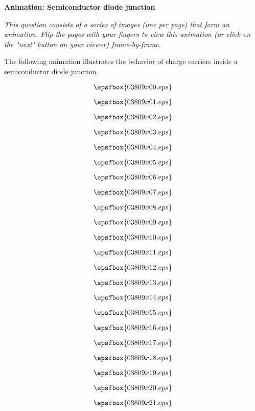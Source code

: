 

\centerline{\bf Animation: Semiconductor diode junction}

\vskip 10pt

{\it This question consists of a series of images (one per page) that form an animation.  Flip the pages with your fingers to view this animation (or click on the "next" button on your viewer) frame-by-frame.}

\vskip 10pt

The following animation illustrates the behavior of charge carriers inside a semiconductor diode junction.

\vfil \eject
$$\epsfbox{03809x00.eps}$$

\vfil \eject
$$\epsfbox{03809x01.eps}$$

\vfil \eject
$$\epsfbox{03809x02.eps}$$

\vfil \eject
$$\epsfbox{03809x03.eps}$$

\vfil \eject
$$\epsfbox{03809x04.eps}$$

\vfil \eject
$$\epsfbox{03809x05.eps}$$

\vfil \eject
$$\epsfbox{03809x06.eps}$$

\vfil \eject
$$\epsfbox{03809x07.eps}$$

\vfil \eject
$$\epsfbox{03809x08.eps}$$

\vfil \eject
$$\epsfbox{03809x09.eps}$$

\vfil \eject
$$\epsfbox{03809x10.eps}$$

\vfil \eject
$$\epsfbox{03809x11.eps}$$

\vfil \eject
$$\epsfbox{03809x12.eps}$$

\vfil \eject
$$\epsfbox{03809x13.eps}$$

\vfil \eject
$$\epsfbox{03809x14.eps}$$

\vfil \eject
$$\epsfbox{03809x15.eps}$$

\vfil \eject
$$\epsfbox{03809x16.eps}$$

\vfil \eject
$$\epsfbox{03809x17.eps}$$

\vfil \eject
$$\epsfbox{03809x18.eps}$$

\vfil \eject
$$\epsfbox{03809x19.eps}$$

\vfil \eject
$$\epsfbox{03809x20.eps}$$

\vfil \eject
$$\epsfbox{03809x21.eps}$$

